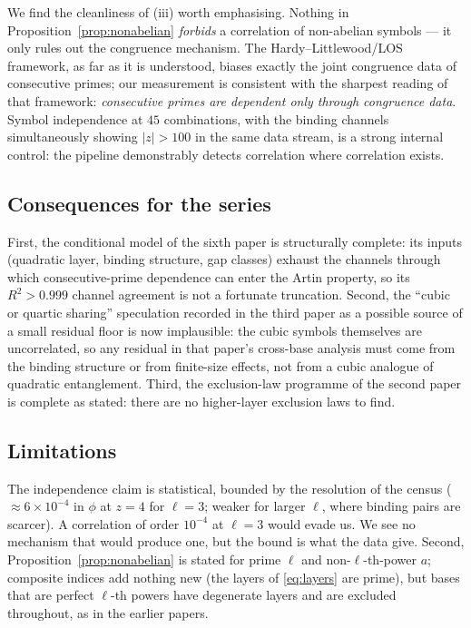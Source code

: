 \documentclass[11pt,reqno]{amsart}
\theoremstyle{plain}
\theoremstyle{definition}
\begin{document}
We find the cleanliness of (iii) worth emphasising. Nothing in
Proposition~\ref{prop:nonabelian} \emph{forbids} a correlation of
non-abelian symbols --- it only rules out the congruence mechanism. The
Hardy--Littlewood/LOS framework, as far as it is understood, biases exactly
the joint congruence data of consecutive primes; our measurement is
consistent with the sharpest reading of that framework: \emph{consecutive
primes are dependent only through congruence data}. Symbol independence at
$45$ combinations, with the binding channels simultaneously showing
$|z| > 100$ in the same data stream, is a strong internal control: the
pipeline demonstrably detects correlation where correlation exists.

\subsection*{Consequences for the series}
First, the conditional model of the sixth paper is structurally complete:
its inputs (quadratic layer, binding structure, gap classes) exhaust the
channels through which consecutive-prime dependence can enter the Artin
property, so its $R^2 > 0.999$ channel agreement is not a fortunate
truncation. Second, the ``cubic or quartic sharing'' speculation recorded in
the third paper as a possible source of a small residual floor is now
implausible: the cubic symbols themselves are uncorrelated, so any residual
in that paper's cross-base analysis must come from the binding structure or
from finite-size effects, not from a cubic analogue of quadratic
entanglement. Third, the exclusion-law programme of the second paper is
complete as stated: there are no higher-layer exclusion laws to find.

\subsection*{Limitations}
The independence claim is statistical, bounded by the resolution of the
census ($\approx 6\times10^{-4}$ in $\phi$ at $z = 4$ for $\ell = 3$;
weaker for larger $\ell$, where binding pairs are scarcer). A correlation of
order $10^{-4}$ at $\ell = 3$ would evade us. We see no mechanism that would
produce one, but the bound is what the data give. Second,
Proposition~\ref{prop:nonabelian} is stated for prime $\ell$ and non-$\ell$-th-power
$a$; composite indices add nothing new (the layers of \eqref{eq:layers} are
prime), but bases that are perfect $\ell$-th powers have degenerate layers
and are excluded throughout, as in the earlier papers.
\end{document}
